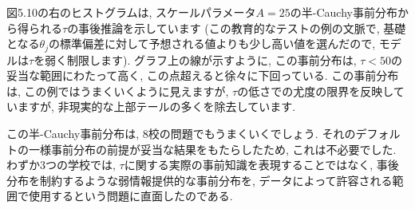 \documentclass[10pt,dvipdfmx,a4]{beamer}
\begin{document}
\begin{frame}
図5.10の右のヒストグラムは, スケールパラメータ$A=25$の半-Cauchy事前分布から得られる$\tau$の事後推論を示しています
(この教育的なテストの例の文脈で, 基礎となる$\theta_j$の標準偏差に対して予想される値よりも少し高い値を選んだので, モデルは$\tau$を弱く制限します).
グラフ上の線が示すように, この事前分布は, $\tau<50$の妥当な範囲にわたって高く, この点超えると徐々に下回っている.
この事前分布は, この例ではうまくいくように見えますが, $\tau$の低さでの尤度の限界を反映していますが, 非現実的な上部テールの多くを除去しています.

この半-Cauchy事前分布は, 8校の問題でもうまくいくでしょう.
それのデフォルトの一様事前分布の前提が妥当な結果をもたらしたため, これは不必要でした.
わずか3つの学校では, $\tau$に関する実際の事前知識を表現することではなく, 事後分布を制約するような弱情報提供的な事前分布を, データによって許容される範囲で使用するという問題に直面したのである.
\end{frame}

\end{document}

